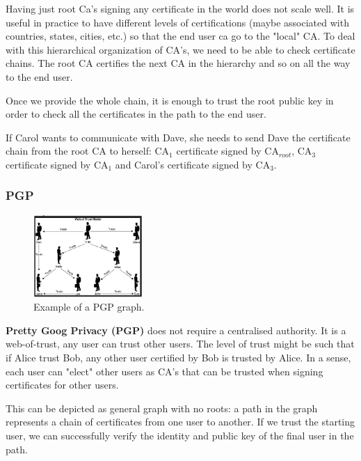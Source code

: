 \documentclass[a4paper, 12pt]{report}
\begin{document}
Having just root Ca's signing any certificate in the world does not scale well. It is useful in practice to have different levels of certifications (maybe associated with countries, states, cities, etc.) so that the end user ca go to the "local" CA. To deal with this hierarchical organization of CA's, we need to be able to check certificate chains. The root CA certifies the next CA in the hierarchy and so on all the way to the end user.

Once we provide the whole chain, it is enough to trust the root public key in order to check all the certificates in the path to the end user. 

If Carol wants to communicate with Dave, she needs to send Dave the certificate chain from the root CA to herself: CA$_1$ certificate signed by CA$_{root}$, CA$_3$ certificate signed by CA$_1$ and Carol's certificate signed by CA$_3$. 

\subsubsection{PGP}
\begin{figure}
	\includegraphics[width=0.37\textwidth]{images/lec23/pgp.png}
	\caption{Example of a PGP graph.}
	\label{fig:pgp}
\end{figure}
\textbf{Pretty Goog Privacy (PGP)} does not require a centralised authority. It is a web-of-trust, any user can trust other users. The level of trust might be such that if Alice trust Bob, any other user certified by Bob is trusted by Alice. In a sense, each user can "elect" other users as CA's that can be trusted when signing certificates for other users. 

This can be depicted as general graph with no roots: a path in the graph represents a chain of certificates from one user to another. If we trust the starting user, we can successfully verify the identity and public key of the final user in the path.
\end{document}
